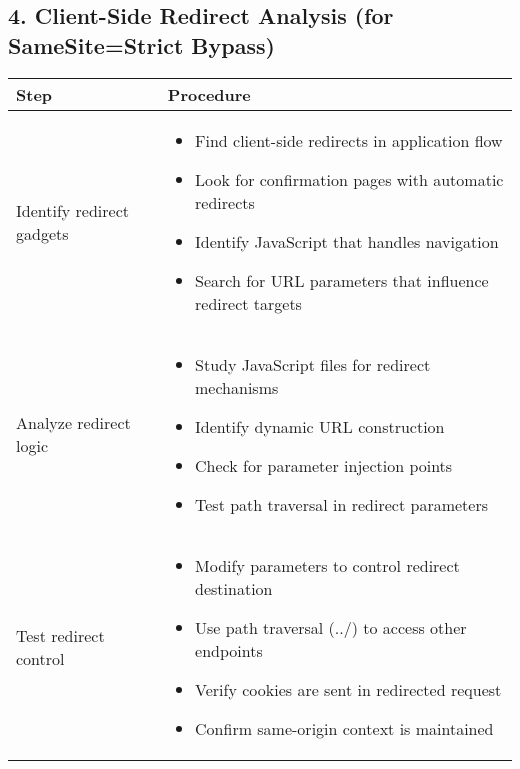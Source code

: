 \documentclass{article}
\begin{document}
\subsection*{4. Client-Side Redirect Analysis (for SameSite=Strict Bypass)}
\begin{tabular}{>{\raggedright\arraybackslash}p{}>{\raggedright\arraybackslash}p{}}
    \toprule
    \textbf{Step} & \textbf{Procedure} \\
    \midrule
    Identify redirect gadgets & 
    \begin{itemize}
        \setlength\itemsep{0em}
        \item Find client-side redirects in application flow
        \item Look for confirmation pages with automatic redirects
        \item Identify JavaScript that handles navigation
        \item Search for URL parameters that influence redirect targets
    \end{itemize} \\
    Analyze redirect logic & 
    \begin{itemize}
        \setlength\itemsep{0em}
        \item Study JavaScript files for redirect mechanisms
        \item Identify dynamic URL construction
        \item Check for parameter injection points
        \item Test path traversal in redirect parameters
    \end{itemize} \\
    Test redirect control & 
    \begin{itemize}
        \setlength\itemsep{0em}
        \item Modify parameters to control redirect destination
        \item Use path traversal (../) to access other endpoints
        \item Verify cookies are sent in redirected request
        \item Confirm same-origin context is maintained
    \end{itemize} \\
    \bottomrule
\end{tabular}
\end{document}
